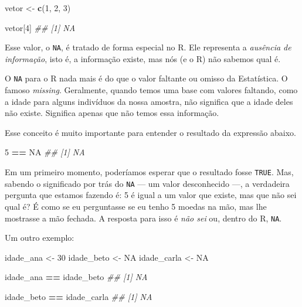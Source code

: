 \documentclass[]{book}
\newenvironment{Shaded}{\begin{snugshade}}{\end{snugshade}}
\newcommand{\CommentTok}[1]{\textcolor[rgb]{0.56,0.35,0.01}{\textit{#1}}}
\newcommand{\DecValTok}[1]{\textcolor[rgb]{0.00,0.00,0.81}{#1}}
\newcommand{\KeywordTok}[1]{\textcolor[rgb]{0.13,0.29,0.53}{\textbf{#1}}}
\newcommand{\NormalTok}[1]{#1}
\newcommand{\OperatorTok}[1]{\textcolor[rgb]{0.81,0.36,0.00}{\textbf{#1}}}
\newcommand{\OtherTok}[1]{\textcolor[rgb]{0.56,0.35,0.01}{#1}}
\newcommand{\StringTok}[1]{\textcolor[rgb]{0.31,0.60,0.02}{#1}}
\begin{document}
\begin{Shaded}
\begin{Highlighting}[]
\NormalTok{vetor <-}\StringTok{ }\KeywordTok{c}\NormalTok{(}\DecValTok{1}\NormalTok{, }\DecValTok{2}\NormalTok{, }\DecValTok{3}\NormalTok{)}

\NormalTok{vetor[}\DecValTok{4}\NormalTok{]}
\CommentTok{## [1] NA}
\end{Highlighting}
\end{Shaded}

Esse valor, o \texttt{NA}, é tratado de forma especial no R. Ele representa a \emph{ausência de informação}, isto é, a informação existe, mas nós (e o R) não sabemos qual é.

O \texttt{NA} para o R nada mais é do que o valor faltante ou omisso da Estatística. O famoso \emph{missing}. Geralmente, quando temos uma base com valores faltando, como a idade para alguns indivíduos da nossa amostra, não significa que a idade deles não existe. Significa apenas que não temos essa informação.

Esse conceito é muito importante para entender o resultado da expressão abaixo.

\begin{Shaded}
\begin{Highlighting}[]
\DecValTok{5} \OperatorTok{==}\StringTok{ }\OtherTok{NA}
\CommentTok{## [1] NA}
\end{Highlighting}
\end{Shaded}

Em um primeiro momento, poderíamos esperar que o resultado fosse \texttt{TRUE}. Mas, sabendo o significado por trás do \texttt{NA} --- um valor desconhecido ---, a verdadeira pergunta que estamos fazendo é: 5 é igual a um valor que existe, mas que não sei qual é? É como se eu perguntasse se eu tenho 5 moedas na mão, mas lhe mostrasse a mão fechada. A resposta para isso é \emph{não sei} ou, dentro do R, \texttt{NA}.

Um outro exemplo:

\begin{Shaded}
\begin{Highlighting}[]
\NormalTok{idade_ana <-}\StringTok{ }\DecValTok{30}
\NormalTok{idade_beto <-}\StringTok{ }\OtherTok{NA}
\NormalTok{idade_carla <-}\StringTok{ }\OtherTok{NA}

\NormalTok{idade_ana }\OperatorTok{==}\StringTok{ }\NormalTok{idade_beto}
\CommentTok{## [1] NA}

\NormalTok{idade_beto }\OperatorTok{==}\StringTok{ }\NormalTok{idade_carla}
\CommentTok{## [1] NA}
\end{Highlighting}
\end{Shaded}
\end{document}
